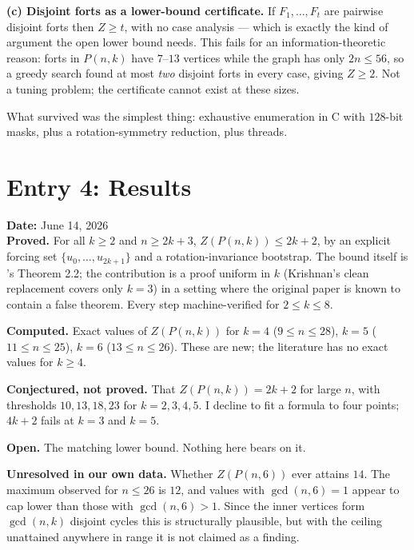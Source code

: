 \documentclass[12pt]{article}
\begin{document}
\textbf{(c) Disjoint forts as a lower-bound certificate.} If $F_1,\dots,F_t$
are pairwise disjoint forts then $Z\ge t$, with no case analysis --- which is
exactly the kind of argument the open lower bound needs. This fails for an
information-theoretic reason: forts in $P(n,k)$ have $7$--$13$ vertices while
the graph has only $2n\le56$, so a greedy search found at most \emph{two}
disjoint forts in every case, giving $Z\ge2$. Not a tuning problem; the
certificate cannot exist at these sizes.

What survived was the simplest thing: exhaustive enumeration in C with
$128$-bit masks, plus a rotation-symmetry reduction, plus threads.


\clearpage
\section*{Entry 4: Results}
\textbf{Date:} June 14, 2026\\
\textbf{Proved.} For all $k\ge2$ and $n\ge2k+3$, $Z(P(n,k))\le2k+2$, by an
explicit forcing set $\{u_0,\dots,u_{2k+1}\}$ and a rotation-invariance
bootstrap. The bound itself is \cite{RST}'s Theorem 2.2; the contribution is a
proof uniform in $k$ (Krishnan's clean replacement covers only $k=3$) in a
setting where the original paper is known to contain a false theorem. Every
step machine-verified for $2\le k\le8$.

\textbf{Computed.} Exact values of $Z(P(n,k))$ for $k=4$ ($9\le n\le28$),
$k=5$ ($11\le n\le25$), $k=6$ ($13\le n\le26$). These are new; the literature
has no exact values for $k\ge4$.

\textbf{Conjectured, not proved.} That $Z(P(n,k))=2k+2$ for large $n$, with
thresholds $10,13,18,23$ for $k=2,3,4,5$. I decline to fit a formula to four
points; $4k+2$ fails at $k=3$ and $k=5$.

\textbf{Open.} The matching lower bound. Nothing here bears on it.

\textbf{Unresolved in our own data.} Whether $Z(P(n,6))$ ever attains $14$.
The maximum observed for $n\le26$ is $12$, and values with $\gcd(n,6)=1$ appear
to cap lower than those with $\gcd(n,6)>1$. Since the inner vertices form
$\gcd(n,k)$ disjoint cycles this is structurally plausible, but with the
ceiling unattained anywhere in range it is not claimed as a finding.


\clearpage
\end{document}
